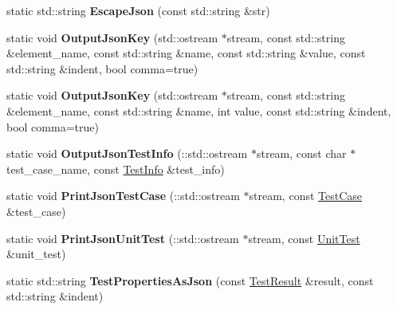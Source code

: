 \begin{DoxyCompactItemize}
\item 
\mbox{\label{classtesting_1_1internal_1_1_json_unit_test_result_printer_a1db1a765a0ed6402d9585f2fe131fde6}} 
static std\+::string {\bfseries Escape\+Json} (const std\+::string \&str)
\item 
\mbox{\label{classtesting_1_1internal_1_1_json_unit_test_result_printer_a63dcc481aba7d2305fad8ad9d4d8090c}} 
static void {\bfseries Output\+Json\+Key} (std\+::ostream $\ast$stream, const std\+::string \&element\+\_\+name, const std\+::string \&name, const std\+::string \&value, const std\+::string \&indent, bool comma=true)
\item 
\mbox{\label{classtesting_1_1internal_1_1_json_unit_test_result_printer_a312b071e5ed3913b854490b1e427d326}} 
static void {\bfseries Output\+Json\+Key} (std\+::ostream $\ast$stream, const std\+::string \&element\+\_\+name, const std\+::string \&name, int value, const std\+::string \&indent, bool comma=true)
\item 
\mbox{\label{classtesting_1_1internal_1_1_json_unit_test_result_printer_ac71993ea21af1c1c1b3b8b942790d127}} 
static void {\bfseries Output\+Json\+Test\+Info} (\+::std\+::ostream $\ast$stream, const char $\ast$test\+\_\+case\+\_\+name, const \mbox{\hyperlink{classtesting_1_1_test_info}{Test\+Info}} \&test\+\_\+info)
\item 
\mbox{\label{classtesting_1_1internal_1_1_json_unit_test_result_printer_a7c939f77c4e1245048a69af80f3db787}} 
static void {\bfseries Print\+Json\+Test\+Case} (\+::std\+::ostream $\ast$stream, const \mbox{\hyperlink{classtesting_1_1_test_case}{Test\+Case}} \&test\+\_\+case)
\item 
\mbox{\label{classtesting_1_1internal_1_1_json_unit_test_result_printer_a18b5f31f180d47044871e0dd4ec38a00}} 
static void {\bfseries Print\+Json\+Unit\+Test} (\+::std\+::ostream $\ast$stream, const \mbox{\hyperlink{classtesting_1_1_unit_test}{Unit\+Test}} \&unit\+\_\+test)
\item 
\mbox{\label{classtesting_1_1internal_1_1_json_unit_test_result_printer_af6c2baf27486ffa5ac7fd328044ec235}} 
static std\+::string {\bfseries Test\+Properties\+As\+Json} (const \mbox{\hyperlink{classtesting_1_1_test_result}{Test\+Result}} \&result, const std\+::string \&indent)
\end{DoxyCompactItemize}
